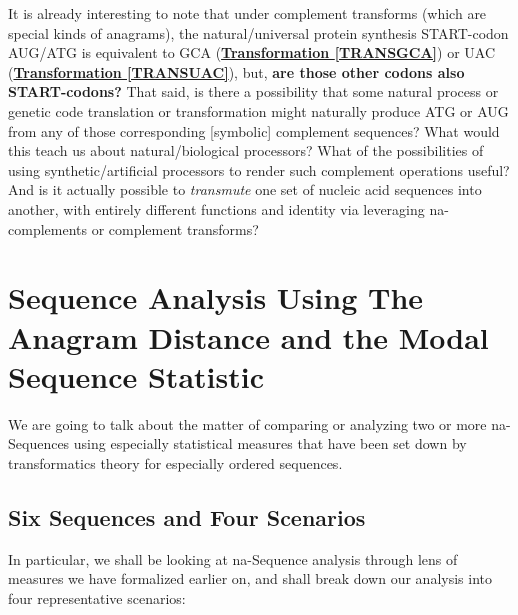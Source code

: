\documentclass[a4paper, 18pt]{book} %
\begin{document}
It is already interesting to note that under complement transforms (which are special kinds of anagrams), the natural/universal protein synthesis START-codon AUG/ATG is equivalent to GCA (\textbf{\hyperref[TRANSGCA]{Transformation \ref{TRANSGCA}}}) or UAC (\textbf{\hyperref[TRANSUAC]{Transformation \ref{TRANSUAC}}}), but, \textbf{are those other codons also START-codons?} That said, is there a possibility that some natural process or genetic code translation or transformation might naturally produce ATG or AUG from any of those corresponding [symbolic] complement sequences? What would this teach us about natural/biological processors? What of the possibilities of using synthetic/artificial processors to render such complement operations useful? And is it actually possible to \textit{transmute} one set of nucleic acid sequences into another, with entirely different functions and identity via leveraging na-complements or complement transforms?




\chapter{Sequence Analysis Using The Anagram Distance and the Modal Sequence Statistic}
\label{SEC4A}



We are going to talk about the matter of comparing or analyzing two or more na-Sequences using especially statistical measures that have been set down by transformatics theory for especially ordered sequences. 

\section{Six Sequences and Four Scenarios}
\label{SEC4ASEQ}

In particular, we shall be looking at na-Sequence analysis through lens of measures we have formalized earlier on, and shall break down our analysis into four representative scenarios:
\end{document}
